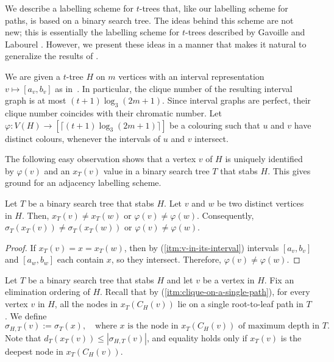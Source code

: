 \documentclass[kpfonts]{patmorin}
\let\le\leqslant
\newcommand{\itemref}[1]{(\ref{#1})}
\begin{document}
We describe a labelling scheme for $t$-trees that, like our labelling scheme for paths, is based on a binary search tree.  The ideas behind this scheme are not new; this is essentially the labelling scheme for $t$-trees described by Gavoille and Labourel \cite{gavoille.labourel:shorter}.  However, we present these ideas in a manner that makes it natural to generalize the results of .


We are given a $t$-tree $H$ on $m$ vertices with an interval representation $v\mapsto[a_v,b_v]$ as in~. 
In particular, the clique number of the resulting interval graph is at most $(t+1)\log_3 (2m+1)$.
Since interval graphs are perfect, their clique number coincides with their chromatic number.
Let $\varphi: V(H) \to [\lceil(t+1)\log_3 (2m+1)\rceil]$ be a colouring such that $u$ and $v$ have distinct colours, whenever the intervals of $u$ and $v$ intersect. 

The following easy observation shows that a vertex $v$ of $H$ is uniquely identified by $\varphi(v)$ and 
an $x_T(v)$ value in a binary search tree $T$ that stabs $H$.
This gives ground for an adjacency labelling scheme.
\begin{obs}
    Let $T$ be a binary search tree that stabs $H$.
    Let $v$ and $w$ be two distinct vertices in $H$. 
    Then, $x_T(v)\neq x_T(w)$ or $\varphi(v)\neq\varphi(w)$. 
    Consequently, $\sigma_T(x_T(v))\neq \sigma_T(x_T(w))$ or $\varphi(v)\neq\varphi(w)$.
\end{obs}

\begin{proof}
  If $x_T(v)=x=x_T(w)$, then by \itemref{itm:v-in-its-interval} intervals $[a_v,b_v]$ and $[a_w,b_w]$ each contain $x$, 
  so they intersect. 
  Therefore, $\varphi(v)\neq\varphi(w)$.%
\end{proof}

Let $T$ be a binary search tree that stabs $H$ and let $v$ be a vertex in $H$. 
Fix an elimination ordering of $H$. 
Recall that by \itemref{itm:clique-on-a-single-path}, 
for every vertex $v$ in $H$, 
all the nodes in $x_T(C_H(v))$ lie on a single root-to-leaf path in $T$. 
We define
\[
\sigma_{H,T}(v):=\sigma_T(x),\quad\text{where $x$ is the node in $x_T(C_H(v))$ of maximum depth in $T$.}
\]
Note that $d_T(x_T(v))\le |\sigma_{H,T}(v)|$, and equality holds only if $x_T(v)$ is the deepest node in $x_T(C_H(v))$.
\end{document}
